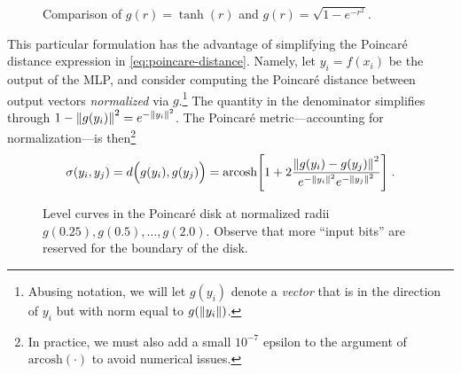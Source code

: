 \documentclass{article}
\begin{document}
\begin{figure}[ht]
  \centering
  \caption{Comparison of $g(r) = \tanh(r)$ and $g(r) = \sqrt{1 - e^{-r^2}}$.}
  \label{fig:radial-transformations}
\end{figure}

This particular formulation has the advantage of simplifying the Poincaré distance expression in \eqref{eq:poincare-distance}. Namely, let $y_i = f(x_i)$ be the output of the MLP, and consider computing the Poincaré distance between output vectors \emph{normalized} via $g$.\footnote{Abusing notation, we will let $g(y_i)$ denote a \emph{vector} that is in the direction of $y_i$ but with norm equal to $g(\norm{y_i})$.} The quantity in the denominator simplifies through $1 - \norm{g(y_i)}^2 = e^{-\norm{y_i}^2}$. The Poincaré metric---accounting for normalization---is then\footnote{In practice, we must also add a small $10^{-7}$ epsilon to the argument of $\text{arcosh}(\cdot)$ to avoid numerical issues.}
\begin{align}
  \sigma(y_i, y_j)
  = d \Big( g(y_i), g(y_j) \Big)
  = \text{arcosh} \qty[1 + 2 \frac{\norm{g(y_i) - g(y_j)}^2}{e^{-\norm{y_i}^2} e^{-\norm{y_j}^2}}] \; .
\end{align}

\begin{figure}[ht]
  \centering
  \caption{Level curves in the Poincaré disk at normalized radii $g(0.25), g(0.5), \dots, g(2.0)$. Observe that more ``input bits'' are reserved for the boundary of the disk.}
  \label{fig:poincare-level-curves}
\end{figure}
\end{document}
